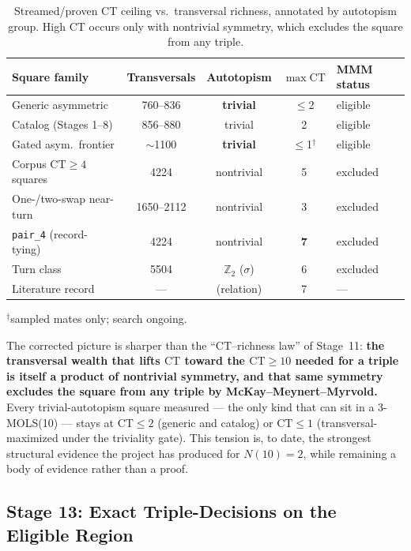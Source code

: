 \documentclass[11pt,a4paper]{article}
\theoremstyle{remark}
\newcommand{\CT}{\mathrm{CT}}
\begin{document}
\begin{table}[h]
\centering
\caption{Streamed/proven $\CT$ ceiling vs.\ transversal richness, annotated
by autotopism group. High $\CT$ occurs only with nontrivial symmetry, which
excludes the square from any triple.}
\label{tab:ctlaw}
\begin{tabular}{lcccl}
\toprule
Square family & Transversals & Autotopism & $\max \CT$ & MMM status\\
\midrule
Generic asymmetric & 760--836 & \textbf{trivial} & $\leq$2 & eligible\\
Catalog (Stages 1--8) & 856--880 & trivial & 2 & eligible\\
Gated asym.\ frontier & $\sim$1100 & \textbf{trivial} & $\leq$1$^{\dagger}$ & eligible\\
Corpus $\CT\geq4$ squares & 4224 & nontrivial & 5 & excluded\\
One-/two-swap near-turn & 1650--2112 & nontrivial & 3 & excluded\\
\texttt{pair\_4} (record-tying) & 4224 & nontrivial & \textbf{7} & excluded\\
Turn class & 5504 & $\mathbb{Z}_2$ ($\sigma$) & 6 & excluded\\
Literature record & --- & (relation) & 7 & --- \cite{bright2022}\\
\bottomrule
\end{tabular}

\smallskip
{\footnotesize $^{\dagger}$sampled mates only; search ongoing.}
\end{table}

The corrected picture is sharper than the ``$\CT$--richness law'' of
Stage~11: \textbf{the transversal wealth that lifts $\CT$ toward the
$\CT\geq10$ needed for a triple is itself a product of nontrivial
symmetry, and that same symmetry excludes the square from any triple by
McKay--Meynert--Myrvold.} Every trivial-autotopism square measured --- the
only kind that can sit in a 3-MOLS(10) --- stays at $\CT\leq2$ (generic and
catalog) or $\CT\leq1$ (transversal-maximized under the triviality gate).
This tension is, to date, the strongest structural evidence the project has
produced for $N(10)=2$, while remaining a body of evidence rather than a
proof.

\subsection{Stage 13: Exact Triple-Decisions on the Eligible Region}
\label{sec:stage13}
\end{document}

